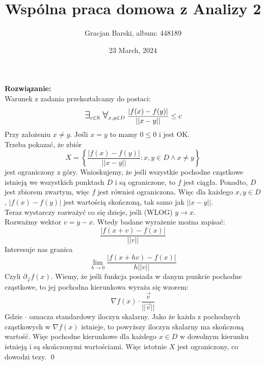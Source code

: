 \documentclass[11pt]{article}
\title{Wspólna praca domowa z Analizy 2}
\author{Gracjan Barski, album: 448189}
\date{23 March, 2024}
\newcommand{\R}{\mathbb{R}}
\newcommand{\Forall}{{\Large\mbox{$\forall$}}}
\newcommand{\Exists}{{\Large\mbox{$\exists$}}}
\begin{document}
\maketitle
\onehalfspacing
\textbf{Rozwiązanie:} \\[5pt]
Warunek z zadania przekształcamy do postaci:
$$\Exists_{c \in \R} \; \Forall_{x, y \in D} \; \frac{|f(x) - f(y)|}{||x - y||} \leq c$$
Przy założeniu $x \neq y$. Jeśli $x = y$ to mamy $0 \leq 0$ i jest OK. \\[5pt]
Trzeba pokazać, że zbiór
$$X = \left\{ \frac{|f(x) - f(y)|}{||x - y||} : x, y \in D \land x \neq y \right\}$$
jest ograniczony z góry. Wnioskujemy, że jeśli wszystkie pochodne cząstkowe istnieją we wszystkich punktach $D$ i są ograniczone, to $f$ jest ciągła. Ponadto, $D$ jest zbiorem zwartym, więc $f$ jest również ograniczona. Więc dla każdego $x, y \in D$, $|f(x) - f(y)|$ jest wartością skończoną, tak samo jak $||x - y||$. \\[5pt]
Teraz wystarczy rozważyć co się dzieje, jeśli (WLOG) $y \to x$. \\[5pt]
Rozważmy wektor $v = y - x$. Wtedy badane wyrażenie można zapisać:
$$\frac{|f(x + v) - f(x)|}{||v||}$$
Interesuje nas granica
$$\lim_{h \to 0} \frac{|f(x + hv) - f(x)|}{h||v||}$$
Czyli $\partial_{\Vec{v}}f(x)$. Wiemy, że jeśli funkcja posiada w danym punkcie pochodne cząstkowe, to jej pochodna kierunkowa wyraża się wzorem:
$$\nabla f(x) \cdot \frac{\Vec{v}}{||\Vec{v}||}$$
Gdzie $\cdot$ oznacza standardowy iloczyn skalarny. Jako że każda z pochodnych cząstkowych w $\nabla f(x)$ istnieje, to powyższy iloczyn skalarny ma skończoną wartość. Więc pochodne kierunkowe dla każdego $x \in D$ w dowolnym kierunku istnieją i są skończonymi wartościami. Więc istotnie $X$ jest ograniczony, co dowodzi tezy. \qed
\end{document}
